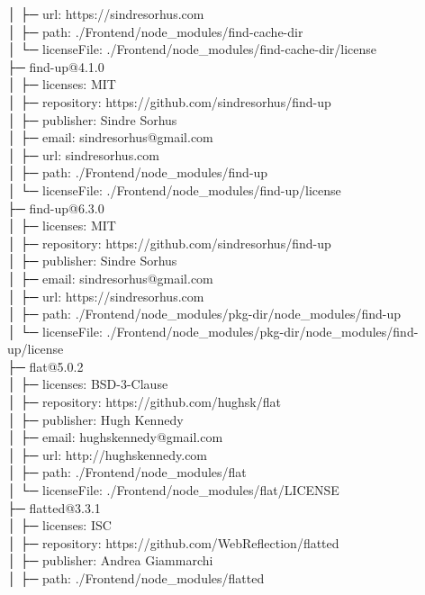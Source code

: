 │  ├─ url: https://sindresorhus.com\\
│  ├─ path: ./Frontend/node\_modules/find-cache-dir\\
│  └─ licenseFile: ./Frontend/node\_modules/find-cache-dir/license\\
├─ find-up@4.1.0\\
│  ├─ licenses: MIT\\
│  ├─ repository: https://github.com/sindresorhus/find-up\\
│  ├─ publisher: Sindre Sorhus\\
│  ├─ email: sindresorhus@gmail.com\\
│  ├─ url: sindresorhus.com\\
│  ├─ path: ./Frontend/node\_modules/find-up\\
│  └─ licenseFile: ./Frontend/node\_modules/find-up/license\\
├─ find-up@6.3.0\\
│  ├─ licenses: MIT\\
│  ├─ repository: https://github.com/sindresorhus/find-up\\
│  ├─ publisher: Sindre Sorhus\\
│  ├─ email: sindresorhus@gmail.com\\
│  ├─ url: https://sindresorhus.com\\
│  ├─ path: ./Frontend/node\_modules/pkg-dir/node\_modules/find-up\\
│  └─ licenseFile: ./Frontend/node\_modules/pkg-dir/node\_modules/find-up/license\\
├─ flat@5.0.2\\
│  ├─ licenses: BSD-3-Clause\\
│  ├─ repository: https://github.com/hughsk/flat\\
│  ├─ publisher: Hugh Kennedy\\
│  ├─ email: hughskennedy@gmail.com\\
│  ├─ url: http://hughskennedy.com\\
│  ├─ path: ./Frontend/node\_modules/flat\\
│  └─ licenseFile: ./Frontend/node\_modules/flat/LICENSE\\
├─ flatted@3.3.1\\
│  ├─ licenses: ISC\\
│  ├─ repository: https://github.com/WebReflection/flatted\\
│  ├─ publisher: Andrea Giammarchi\\
│  ├─ path: ./Frontend/node\_modules/flatted\\
